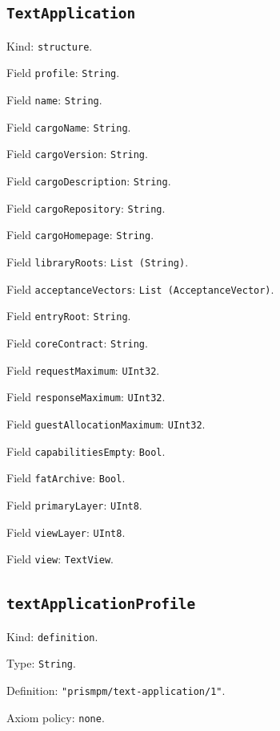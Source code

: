 \documentclass[11pt]{article}
\begin{document}
\subsection*{\texttt{TextApplication}}
\noindent Kind: \texttt{structure}.\par
\noindent Field \texttt{profile}: \texttt{String}.\par
\noindent Field \texttt{name}: \texttt{String}.\par
\noindent Field \texttt{cargoName}: \texttt{String}.\par
\noindent Field \texttt{cargoVersion}: \texttt{String}.\par
\noindent Field \texttt{cargoDescription}: \texttt{String}.\par
\noindent Field \texttt{cargoRepository}: \texttt{String}.\par
\noindent Field \texttt{cargoHomepage}: \texttt{String}.\par
\noindent Field \texttt{libraryRoots}: \texttt{List (String)}.\par
\noindent Field \texttt{acceptanceVectors}: \texttt{List (AcceptanceVector)}.\par
\noindent Field \texttt{entryRoot}: \texttt{String}.\par
\noindent Field \texttt{coreContract}: \texttt{String}.\par
\noindent Field \texttt{requestMaximum}: \texttt{UInt32}.\par
\noindent Field \texttt{responseMaximum}: \texttt{UInt32}.\par
\noindent Field \texttt{guestAllocationMaximum}: \texttt{UInt32}.\par
\noindent Field \texttt{capabilitiesEmpty}: \texttt{Bool}.\par
\noindent Field \texttt{fatArchive}: \texttt{Bool}.\par
\noindent Field \texttt{primaryLayer}: \texttt{UInt8}.\par
\noindent Field \texttt{viewLayer}: \texttt{UInt8}.\par
\noindent Field \texttt{view}: \texttt{TextView}.\par
\subsection*{\texttt{textApplicationProfile}}
\noindent Kind: \texttt{definition}.\par
\noindent Type: \texttt{String}.\par
\noindent Definition: \texttt{"prismpm/text-application/1"}.\par
\noindent Axiom policy: \texttt{none}.\par
\end{document}
